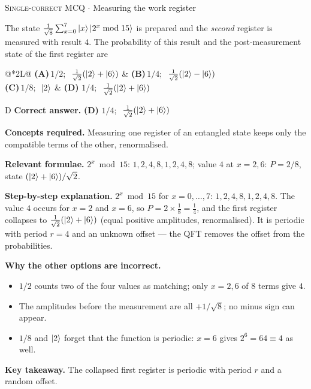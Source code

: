 \documentclass[11pt,a4paper]{article}
\newcommand{\optlabel}[1]{\textbf{(#1)}}
\newcommand{\correctlabel}[1]{\textcolor{okgreen}{\textbf{(#1)}\,\ding{51}}}
\newenvironment{qitem}[1]{\begin{list}{}{\setlength{\leftmargin}{3.3em}\setlength{\labelwidth}{3.1em}%
  \setlength{\labelsep}{0.2em}\setlength{\topsep}{3pt}\setlength{\parsep}{3pt}}\item[\textbf{Q.#1}\hfill]}{\end{list}}
\newcommand{\qsep}{\par\vspace{2pt}{\color{black!15}\hrule}\vspace{4pt}}
\newcommand{\qmeta}[2]{{\footnotesize\color{black!60}\textsc{#1} \;$\cdot$\; #2}\par}
\begin{document}
\begin{qitem}{22}
\qmeta{Single-correct MCQ}{Measuring the work register}
The state $\frac{1}{\sqrt8}\sum_{x=0}^{7}\ket x\ket{2^x \bmod 15}$ is prepared and the \emph{second} register is measured with result $4$. The probability
of this result and the post-measurement state of the first register are
\par\smallskip\noindent\begin{tabularx}{\linewidth}{@{}*{2}{L}@{}}
\optlabel{A}\,$1/2$; $\ \frac{1}{\sqrt2}(\ket2 + \ket6)$ & \optlabel{B}\,$1/4$; $\ \frac{1}{\sqrt2}(\ket2 - \ket6)$ \\[3pt]
\optlabel{C}\,$1/8$; $\ \ket2$ & \correctlabel{D}\,$1/4$; $\ \frac{1}{\sqrt2}(\ket2 + \ket6)$
\end{tabularx}
\end{qitem}
\begin{solbox}{D}
\textbf{\color{brand}Correct answer.} \textcolor{okgreen}{\textbf{(D)}} $1/4$; $\ \frac{1}{\sqrt2}(\ket2 + \ket6)$

\textbf{\color{brand}Concepts required.} Measuring one register of an entangled state keeps only the compatible terms of the other, renormalised.

\textbf{\color{brand}Relevant formulae.} $2^x \bmod 15$: $1, 2, 4, 8, 1, 2, 4, 8$; value $4$ at $x = 2, 6$: $P = 2/8$, state $(\ket2 + \ket6)/\sqrt2$.

\textbf{\color{brand}Step-by-step explanation.} $2^x \bmod 15$ for $x = 0, \dots, 7$: $1, 2, 4, 8, 1, 2, 4, 8$. The value $4$ occurs for $x = 2$ and $x = 6$, so
$P = 2\times\frac18 = \frac14$, and the first register collapses to $\frac{1}{\sqrt2}(\ket2 + \ket6)$ (equal positive amplitudes, renormalised). It is periodic
with period $r = 4$ and an unknown offset --- the QFT removes the offset from the probabilities.

\textbf{\color{brand}Why the other options are incorrect.}
\begin{itemize}[leftmargin=2.4em, itemsep=1pt, topsep=2pt]
\item[\textbf{(A)}] $1/2$ counts two of the four values as matching; only $x = 2, 6$ of $8$ terms give $4$.
\item[\textbf{(B)}] The amplitudes before the measurement are all $+1/\sqrt8$; no minus sign can appear.
\item[\textbf{(C)}] $1/8$ and $\ket2$ forget that the function is periodic: $x = 6$ gives $2^6 = 64 \equiv 4$ as well.
\end{itemize}
\textbf{\color{brand}Key takeaway.} The collapsed first register is periodic with period $r$ and a random offset.
\end{solbox}
\qsep
\end{document}
